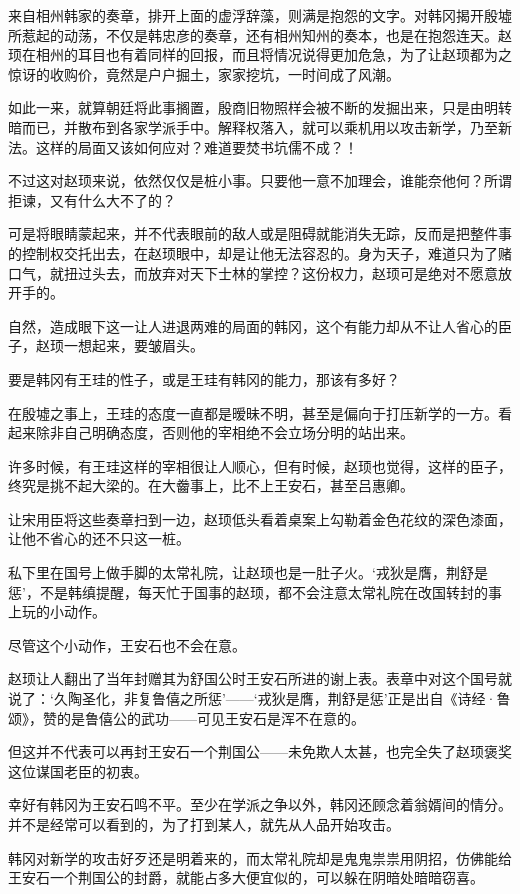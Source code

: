 来自相州韩家的奏章，排开上面的虚浮辞藻，则满是抱怨的文字。对韩冈揭开殷墟所惹起的动荡，不仅是韩忠彦的奏章，还有相州知州的奏本，也是在抱怨连天。赵顼在相州的耳目也有着同样的回报，而且将情况说得更加危急，为了让赵顼都为之惊讶的收购价，竟然是户户掘土，家家挖坑，一时间成了风潮。

如此一来，就算朝廷将此事搁置，殷商旧物照样会被不断的发掘出来，只是由明转暗而已，并散布到各家学派手中。解释权落入，就可以乘机用以攻击新学，乃至新法。这样的局面又该如何应对？难道要焚书坑儒不成？！

不过这对赵顼来说，依然仅仅是桩小事。只要他一意不加理会，谁能奈他何？所谓拒谏，又有什么大不了的？

可是将眼睛蒙起来，并不代表眼前的敌人或是阻碍就能消失无踪，反而是把整件事的控制权交托出去，在赵顼眼中，却是让他无法容忍的。身为天子，难道只为了赌口气，就扭过头去，而放弃对天下士林的掌控？这份权力，赵顼可是绝对不愿意放开手的。

自然，造成眼下这一让人进退两难的局面的韩冈，这个有能力却从不让人省心的臣子，赵顼一想起来，要皱眉头。

要是韩冈有王珪的性子，或是王珪有韩冈的能力，那该有多好？

在殷墟之事上，王珪的态度一直都是暧昧不明，甚至是偏向于打压新学的一方。看起来除非自己明确态度，否则他的宰相绝不会立场分明的站出来。

许多时候，有王珪这样的宰相很让人顺心，但有时候，赵顼也觉得，这样的臣子，终究是挑不起大梁的。在大齤事上，比不上王安石，甚至吕惠卿。

让宋用臣将这些奏章扫到一边，赵顼低头看着桌案上勾勒着金色花纹的深色漆面，让他不省心的还不只这一桩。

私下里在国号上做手脚的太常礼院，让赵顼也是一肚子火。‘戎狄是膺，荆舒是惩’，不是韩缜提醒，每天忙于国事的赵顼，都不会注意太常礼院在改国转封的事上玩的小动作。

尽管这个小动作，王安石也不会在意。

赵顼让人翻出了当年封赠其为舒国公时王安石所进的谢上表。表章中对这个国号就说了：‘久陶圣化，非复鲁僖之所惩’——‘戎狄是膺，荆舒是惩’正是出自《诗经·鲁颂》，赞的是鲁僖公的武功——可见王安石是浑不在意的。

但这并不代表可以再封王安石一个荆国公——未免欺人太甚，也完全失了赵顼褒奖这位谋国老臣的初衷。

幸好有韩冈为王安石鸣不平。至少在学派之争以外，韩冈还顾念着翁婿间的情分。并不是经常可以看到的，为了打到某人，就先从人品开始攻击。

韩冈对新学的攻击好歹还是明着来的，而太常礼院却是鬼鬼祟祟用阴招，仿佛能给王安石一个荆国公的封爵，就能占多大便宜似的，可以躲在阴暗处暗暗窃喜。

